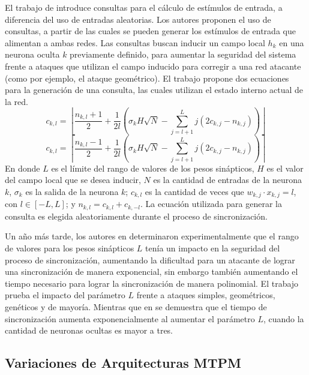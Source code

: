 El trabajo de \cite{Ruttor_2005} introduce consultas para el cálculo de estímulos de entrada, a diferencia del uso de entradas aleatorias. Los autores proponen el uso de consultas, a partir de las cuales se pueden generar los estímulos de entrada que alimentan a ambas redes. Las consultas buscan inducir un campo local $h_k$ en una neurona oculta $k$ previamente definido, para aumentar la seguridad del sistema frente a ataques que utilizan el campo inducido para corregir a una red atacante (como por ejemplo, el ataque geométrico).  
El trabajo propone dos ecuaciones para la generación de una consulta, las cuales utilizan el estado interno actual de la red.
\begin{equation}
    c_{k,l} = \left\lfloor\frac{n_{k,l}+1}{2}+\frac{1}{2l}\left(\sigma_k H \sqrt{N} - \sum_{j=l+1}^{L}j(2c_{k,j}-n_{k,j})\right) \right\rfloor
\end{equation}
\begin{equation}
    c_{k,l} = \left\lceil\frac{n_{k,l}-1}{2}+\frac{1}{2l}\left(\sigma_k H \sqrt{N} - \sum_{j=l+1}^{L}j(2c_{k,j}-n_{k,j})\right) \right\rceil
\end{equation}
En donde $L$ es el límite del rango de valores de los pesos sinápticos, $H$ es el valor del campo local que se desea inducir, $N$ es la cantidad de entradas de la neurona $k$, $\sigma_k$ es la salida de la neurona $k$; $c_{k,l}$ es la cantidad de veces que $w_{k,j} \cdot x_{k,j} = l$, con $l \in [-L,L]$; y $n_{k,l} = c_{k,l} + c_{k,-l}$.
La ecuación utilizada para generar la consulta es elegida aleatoriamente durante el proceso de sincronización. 

Un año más tarde, los autores en \cite{ruttor_neural_2006} determinaron experimentalmente que el rango de valores para los pesos sinápticos $L$ tenía un impacto en la seguridad del proceso de sincronización, aumentando la dificultad para un atacante de lograr una sincronización de manera exponencial, sin embargo también aumentando el tiempo necesario para lograr la sincronización de manera polinomial. El trabajo prueba el impacto del parámetro $L$ frente a ataques simples, geométricos, genéticos y de mayoría. Mientras que en \cite{ruttorDynamicsNeuralCryptography2007} se demuestra que el tiempo de sincronización aumenta exponencialmente al aumentar el parámetro $L$, cuando la cantidad de neuronas ocultas es mayor a tres.

\subsection{Variaciones de Arquitecturas MTPM}
\hfil \\

